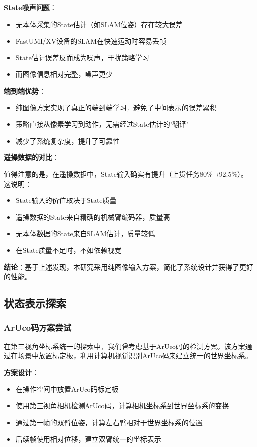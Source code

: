 \textbf{State噪声问题}：
\begin{itemize}[leftmargin=2em]
    \item 无本体采集的State估计（如SLAM位姿）存在较大误差
    \item FastUMI/XV设备的SLAM在快速运动时容易丢帧
    \item State估计误差反而成为噪声，干扰策略学习
    \item 而图像信息相对完整，噪声更少
\end{itemize}

\textbf{端到端优势}：
\begin{itemize}[leftmargin=2em]
    \item 纯图像方案实现了真正的端到端学习，避免了中间表示的误差累积
    \item 策略直接从像素学习到动作，无需经过State估计的"翻译"
    \item 减少了系统复杂度，提升了可靠性
\end{itemize}

\textbf{遥操数据的对比}：

值得注意的是，在遥操数据中，State输入确实有提升（上货任务80\%→92.5\%）。这说明：
\begin{itemize}[leftmargin=2em]
    \item State输入的价值取决于State质量
    \item 遥操数据的State来自精确的机械臂编码器，质量高
    \item 无本体数据的State来自SLAM估计，质量较低
    \item 在State质量不足时，不如依赖视觉
\end{itemize}

\textbf{结论}：基于上述发现，本研究采用纯图像输入方案，简化了系统设计并获得了更好的性能。

\subsection{状态表示探索}

\subsubsection{ArUco码方案尝试}

在第三视角坐标系统一的探索中，我们曾考虑基于ArUco码的检测方案。该方案通过在场景中放置标定板，利用计算机视觉识别ArUco码来建立统一的世界坐标系。

\textbf{方案设计}：
\begin{itemize}[leftmargin=2em]
    \item 在操作空间中放置ArUco码标定板
    \item 使用第三视角相机检测ArUco码，计算相机坐标系到世界坐标系的变换
    \item 通过第一帧的双臂位姿，计算左右臂相对于世界坐标系的位置
    \item 后续帧使用相对位移，建立双臂统一的坐标表示
\end{itemize}

